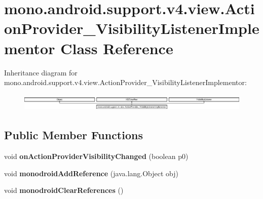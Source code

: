 \hypertarget{classmono_1_1android_1_1support_1_1v4_1_1view_1_1_action_provider___visibility_listener_implementor}{}\section{mono.\+android.\+support.\+v4.\+view.\+Action\+Provider\+\_\+\+Visibility\+Listener\+Implementor Class Reference}
\label{classmono_1_1android_1_1support_1_1v4_1_1view_1_1_action_provider___visibility_listener_implementor}
Inheritance diagram for mono.\+android.\+support.\+v4.\+view.\+Action\+Provider\+\_\+\+Visibility\+Listener\+Implementor\+:\begin{figure}[H]
\begin{center}
\leavevmode
\includegraphics[height=0.837070cm]{classmono_1_1android_1_1support_1_1v4_1_1view_1_1_action_provider___visibility_listener_implementor}
\end{center}
\end{figure}
\subsection*{Public Member Functions}
\begin{DoxyCompactItemize}
\item 
\mbox{\label{classmono_1_1android_1_1support_1_1v4_1_1view_1_1_action_provider___visibility_listener_implementor_a242f9c61e064dd7019178ff6eb12b360}} 
void {\bfseries on\+Action\+Provider\+Visibility\+Changed} (boolean p0)
\item 
\mbox{\label{classmono_1_1android_1_1support_1_1v4_1_1view_1_1_action_provider___visibility_listener_implementor_aa32d9154545fa29cbb80371b3c21e709}} 
void {\bfseries monodroid\+Add\+Reference} (java.\+lang.\+Object obj)
\item 
\mbox{\label{classmono_1_1android_1_1support_1_1v4_1_1view_1_1_action_provider___visibility_listener_implementor_ab013ec17b3d4bb666c53f6acfc93b9c4}} 
void {\bfseries monodroid\+Clear\+References} ()
\end{DoxyCompactItemize}
